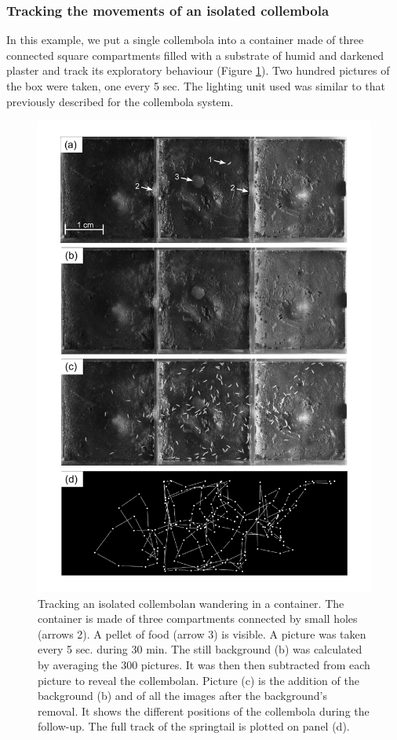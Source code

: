 \subsubsection{Tracking the movements of an isolated collembola}

In this example, we put a single collembola into a container made of three
connected square compartments filled with a substrate of humid and darkened
plaster and track its exploratory behaviour (Figure \ref{Fig21-4}). Two hundred pictures of
the box were taken, one every 5 sec. The lighting unit used was similar to that
previously described for the collembola system.

\begin{figure}[!ht] %
\centering
\includegraphics[height=0.75\textheight]{2_Methodo/Fig/4_TrackCollemboles.pdf}
\caption[ Tracking an isolated collembolan wandering in a container]{ Tracking an isolated collembolan wandering in a container. The container is made of three compartments connected by small holes (arrows 2). A
pellet of food (arrow 3) is visible. A picture was taken every 5 sec. during 30
min. The still background (b) was calculated by averaging the 300 pictures. It
was then then subtracted from each picture to reveal the collembolan. Picture
(c) is the addition of the background (b) and of all the images after the
background's removal. It shows the different positions of the collembola during
the follow-up. The full track of the springtail is plotted on panel (d).}
\label{Fig21-4}
\end{figure}

